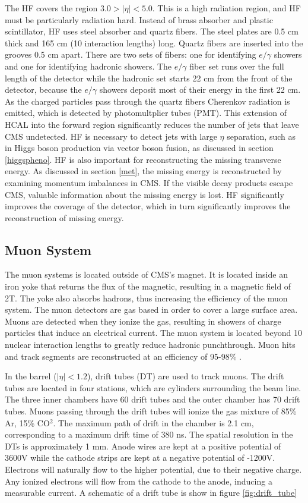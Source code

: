 \documentclass[oneside, letterpaper, oldfontcommands]{memoir}
\begin{document}
\qquad The HF covers the region $3.0 > |\eta| < 5.0$. This is a high radiation region, and HF must be particularly radiation hard. Instead of brass absorber and plastic scintillator, HF uses steel absorber and quartz fibers. The steel plates are 0.5 cm thick and 165 cm (10 interaction lengths) long. Quartz fibers are inserted into the grooves 0.5 cm apart. There are two sets of fibers: one for identifying $e/\gamma$ showers and one for identifying hadronic showers. The $e/\gamma$ fiber set runs over the full length of the detector while the hadronic set starts 22 cm from the front of the detector, because the $e/\gamma$ showers deposit most of their energy in the first 22 cm. As the charged particles pass through the quartz fibers Cherenkov radiation is emitted, which is detected by photomultplier tubes (PMT). This extension of HCAL into the forward region significantly reduces the number of jets that leave CMS undetected. HF is necessary to detect jets with large $\eta$ separation, such as in Higgs boson production via vector boson fusion, as discussed in section \ref{higgspheno}. HF is also important for reconstructing the missing transverse energy. As discussed in section \ref{met}, the missing energy is reconstructed by examining momentum imbalances in CMS. If the visible decay products escape CMS, valuable information about the missing energy is lost. HF significantly improves the coverage of the detector, which in turn significantly improves the reconstruction of missing energy.

\subsection{Muon System}\label{muonsys}
\qquad The muon systems is located outside of CMS's magnet. It is located inside an iron yoke that returns the flux of the magnetic, resulting in a magnetic field of 2T. The yoke also absorbs hadrons, thus increasing the efficiency of the muon system. The muon detectors are gas based in order to cover a large surface area. Muons are detected when they ionize the gas, resulting in showers of charge particles that induce an electrical current. The muon system is located beyond 10 nuclear interaction lengths to greatly reduce hadronic punchthrough. Muon hits and track segments are reconstructed at an efficiency of 95-98\% \cite{Chatrchyan:2013sba}.

\qquad In the barrel ($|\eta| < 1.2$), drift tubes (DT) are used to track muons. The drift tubes are located in four stations, which are cylinders surrounding the beam line. The three inner chambers have 60 drift tubes and the outer chamber has 70 drift tubes. Muons passing through the drift tubes will ionize the gas mixture of 85\% Ar, 15\% CO$^{2}$. The maximum path of drift in the chamber is 2.1 cm, corresponding to a maximum drift time of 380 ns. The spatial resolution in the DTs is approximately 1 mm\cite{Chatrchyan:2013sba}. Anode wires are kept at a positive potential of 3600V while the cathode strips are kept at a negative potential of -1200V. Electrons will naturally flow to the higher potential, due to their negative charge. Any ionized electrons will flow from the cathode to the anode, inducing a measurable current. A schematic of a drift tube is show in figure \ref{fig:drift_tube}
\end{document}
